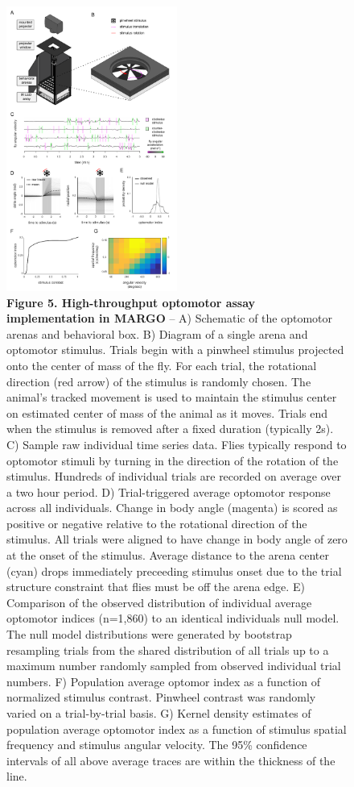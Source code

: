 \documentclass[10pt]{article}
\begin{document}
\newpage
\begin{figure}[h!]
	\begin{center}
		\includegraphics[width=0.5\textwidth]{../figures/Optomotor_panel.pdf}
	\end{center}
	\caption*{\footnotesize \textbf{Figure 5. High-throughput optomotor assay implementation in MARGO} -- A) Schematic of the optomotor arenas and behavioral box. B) Diagram of a single arena and optomotor stimulus. Trials begin with a pinwheel stimulus projected onto the center of mass of the fly. For each trial, the rotational direction (red arrow) of the stimulus is randomly chosen. The animal's tracked movement is used to maintain the stimulus center on estimated center of mass of the animal as it moves. Trials end when the stimulus is removed after a fixed duration (typically 2s). C) Sample raw individual time series data. Flies typically respond to optomotor stimuli by turning in the direction of the rotation of the stimulus. Hundreds of individual trials are recorded on average over a two hour period. D) Trial-triggered average optomotor response across all individuals. Change in body angle (magenta) is scored as positive or negative relative to the rotational direction of the stimulus. All trials were aligned to have change in body angle of zero at the onset of the stimulus. Average distance to the arena center (cyan) drops immediately preceeding stimulus onset due to the trial structure constraint that flies must be off the arena edge. E) Comparison of the observed distribution of individual average optomotor indices (n=1,860) to an identical individuals null model. The null model distributions were generated by bootstrap resampling trials from the shared distribution of all trials up to a maximum number randomly sampled from observed individual trial numbers. F) Population average optomor index as a function of normalized stimulus contrast. Pinwheel contrast was randomly varied on a trial-by-trial basis. G) Kernel density estimates of population average optomotor index as a function of stimulus spatial frequency and stimulus angular velocity. The 95\% confidence intervals of all above average traces are within the thickness of the line.}
\end{figure}
\end{document}
